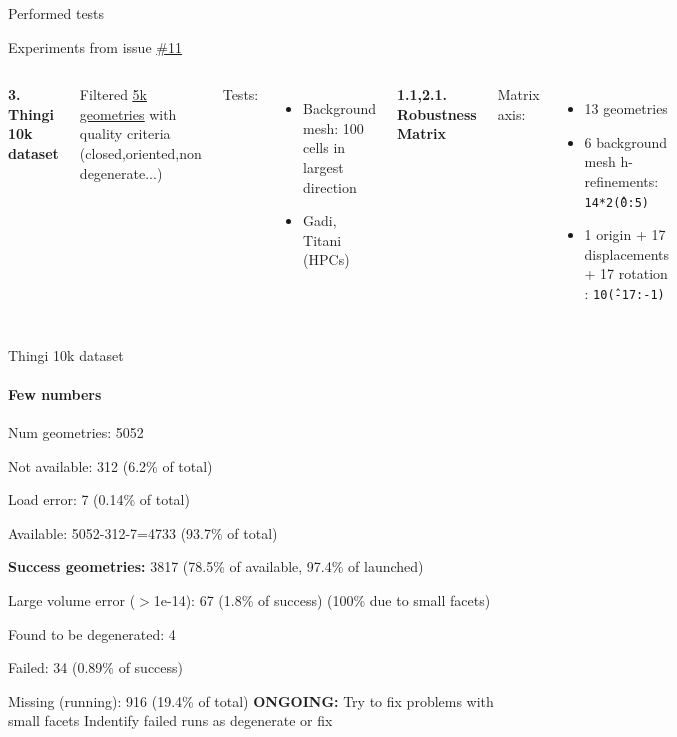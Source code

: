 \documentclass{beamer}
\title{}
\subtitle{STLCutter.jl}
\date{\today}
\author{Pere Antoni Martorell}
\institute{\url{http://github.com/pmartorell/STLCutters.jl}}
\begin{document}
\maketitle
\begin{frame}{Performed tests}

  Experiments from issue
  \href{https://github.com/pmartorell/STLCutters.jl/issues/11}{\#11}

  \vfill{}

  \begin{columns}[c]

    \textbf{3. Thingi 10k dataset}

    Filtered
    \href{https://ten-thousand-models.appspot.com/results.html?q=is+closed\%2C+is+oriented\%2C+is+manifold\%2C+is+not+degenerate\%2C+without+self-intersection\%2C+\%23df\%3D0}{\underline{5k geometries}}
    with quality criteria (closed,oriented,non degenerate...)

    Tests:
    \begin{itemize}
      \item
        Background mesh: 100 cells in largest direction
      \item
        Gadi, Titani (HPCs)
    \end{itemize}
    
    
    \textbf{1.1,2.1. Robustness Matrix}

    Matrix axis:
    \begin{itemize}
      \item
        13 geometries
      \item
        6 background mesh h-refinements: \texttt{14*2\^(0:5)}
      \item
        1 origin + 17 displacements + 17 rotation : \texttt{10\^(-17:-1)}
    \end{itemize}

  \end{columns}
\end{frame}


\begin{frame}{Thingi 10k dataset}
  \framesubtitle{Few numbers}

  Num geometries: 5052

  Not available: 312 (6.2\% of total)

  Load error: 7 (0.14\% of total)

  Available: 5052-312-7=4733 (93.7\% of total)

  \textbf{Success geometries:} 3817 (78.5\% of available, 97.4\% of launched)

  Large volume error ($>$1e-14): 67 (1.8\% of success) (100\% due to small facets)

  Found to be degenerated: 4

  Failed: 34 (0.89\% of success)

  Missing (running): 916 (19.4\% of total)
  \vfill{}
  \textbf{ONGOING:}
  Try to fix problems with small facets
  Indentify failed runs as degenerate or fix



\end{frame}
\end{document}
